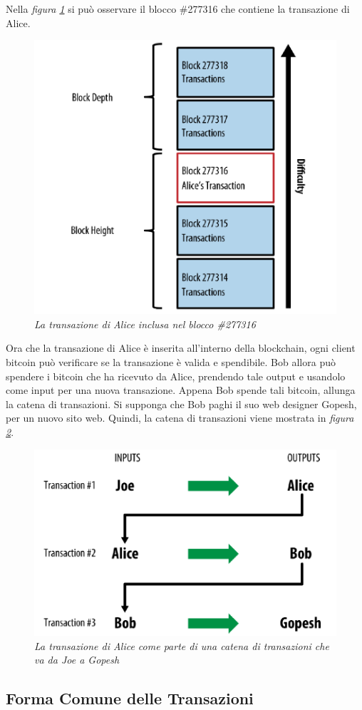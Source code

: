 Nella \textit{figura \ref{fig:aliceblock}} si può osservare il blocco \#277316 che contiene la transazione di Alice.
\begin{figure}[htbp]
	\centering
	\includegraphics[width=0.5 \linewidth]{figure/aliceblock}
	\caption{\textit{La transazione di Alice inclusa nel blocco \#277316} \label{fig:aliceblock}}
\end{figure}

Ora che la transazione di Alice è inserita all'interno della blockchain, ogni client bitcoin può verificare se la transazione è valida e spendibile. Bob allora può spendere i bitcoin che ha ricevuto da Alice, prendendo tale output e usandolo come input per una nuova transazione. Appena Bob spende tali bitcoin, allunga la catena di transazioni. Si supponga che Bob paghi il suo web designer Gopesh, per un nuovo sito web. Quindi, la catena di transazioni viene mostrata in \textit{figura \ref{fig:abchaintxs}}.
\begin{figure}[htbp]
	\centering
	\includegraphics[width=0.5 \linewidth]{figure/abchaintxs}
	\caption{\textit{La transazione di Alice come parte di una catena di transazioni che va da Joe a Gopesh} \label{fig:abchaintxs}}
\end{figure}

\subsection{Forma Comune delle Transazioni}

